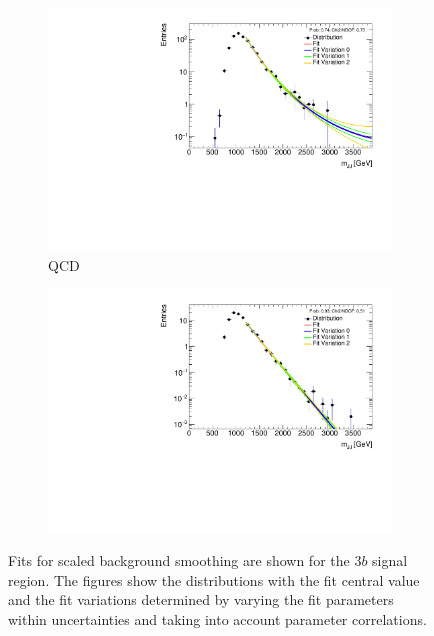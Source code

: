 \begin{figure}[htb!]
  \centering
  \captionsetup{justification=centering}
    \hspace{-2.5cm}
    \begin{subfigure}[b]{0.35\textwidth}
        \includegraphics[width=\textwidth,angle=-90]{figures/boosted/Smooth/qcd_est_ThreeTag_Signal_mHH_pole_l.pdf}
        \caption{QCD}
        \label{fig:signal-region-mjjscaled-smoothing-3b-qcd}
    \end{subfigure}
    \quad \quad \quad \quad \quad
    \begin{subfigure}[b]{0.35\textwidth}
        \includegraphics[width=\textwidth,angle=-90]{figures/boosted/Smooth/ttbar_est_ThreeTag_Signal_mHH_pole_l.pdf}
        \caption{\ttbar}
        \label{fig:signal-region-mjjscaled-smoothing-3b-ttbar}
    \end{subfigure}
    \caption{Fits for scaled background smoothing are shown for the $3b$ signal region. The figures show the distributions with the fit central value and the fit variations determined by varying the fit parameters within uncertainties and taking into account parameter correlations.}
  \label{fig:signal-region-mjjscaled-smoothing-3b}
\end{figure}

